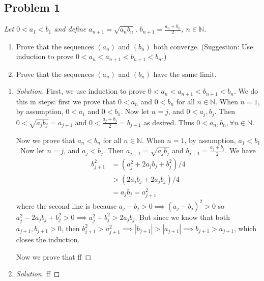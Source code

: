 \documentclass{article}
\newcommand{\N}{{\mathbb N}}
\begin{document}
\subsection*{Problem 1}
{\it Let $0 < a_1 < b_1$ and define
	$a_{n+1} = \sqrt{a_nb_n}$, $b_{n+1} = \frac{a_n + b_n}{2}$, $n \in \N$.
\begin{enumerate}
	\item Prove that the sequences $(a_n)$ and $(b_n)$ both converge.
		(Suggestion: Use induction to prove $0 < a_n < a_{n+1} < b_{n+1} < b_n$.)
	\item Prove that the sequences $(a_n)$ and $(b_n)$ have the same limit.
\end{enumerate}}

\begin{enumerate}
	\item \begin{proof}[Solution]\let\qed\relax
		First, we use induction to prove $0 < a_n < a_{n+1} < b_{n+1} < b_n$.
		We do this in steps:
		first we prove that $0 < a_n$ and $0< b_n$ for all $n \in \N$.
		When $n = 1$, by assumption, $0 < a_1$ and $0 < b_1$.
		Now let $n = j$, and $0 < a_j,b_j$.
		Then $0 < \sqrt{a_jb_j} = a_{j+1}$
		and $0 < \frac{a_j+b_j}{2} = b_{j+1}$
		as desired.
		Thus $0 < a_n,b_n, \forall n \in \N$.

		Now we prove that $a_n < b_n$ for all $n \in \N$.
		When $n = 1$, by assumption, $a_1 < b_1$.
		Now let $n = j$, and $a_j < b_j$.
		Then $a_{j+1} = \sqrt{a_jb_j}$
		and $b_{j+1} = \frac{a_j + b_j}{2}$.
		We have
		\begin{align*}
			b_{j+1}^2
			&= (a_j^2 + 2a_jb_j + b_j^2)/4\\
			&> (2a_jb_j + 2a_jb_j)/4\\
			&= a_jb_j = a_{j+1}^2
		\end{align*}
		where the second line is because $a_j - b_j > 0 \implies (a_j - b_j)^2 > 0$
		so $a_j^2 - 2a_jb_j + b_j^2 > 0 \implies a_j^2 + b_j^2 > 2a_jb_j$.
		But since we know that both $a_{j+1}, b_{j+1} > 0$,
		then $b^2_{j+1} > a^2_{j+1} \implies |b_{j+1}| > |a_{j+1}|
		\implies b_{j+1} > a_{j+1}$, which closes the induction.

		Now we prove that ff
	\end{proof}
	\item \begin{proof}[Solution]\let\qed\relax
		ff
	\end{proof}
\end{enumerate}
\clearpage
\end{document}
